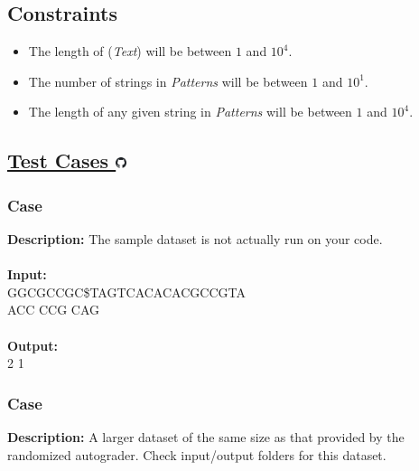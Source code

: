 \documentclass{article}
\renewcommand{\sc}[1]{\text{\scshape #1}}
\newcommand{\code}[1]{{\fontfamily{pcr}\selectfont #1}}
\newcommand{\gitlogo}{\includegraphics[height=12.5]{c0/gitlogo.png}}
\begin{document}
\subsection*{Constraints}
\begin{itemize}
    \item The length of \sc{BWT}(\emph{Text}) will be between $1$ and $10^4$.
    \item The number of strings in \emph{Patterns} will be between $1$ and $10^1$.
    \item The length of any given string in \emph{Patterns} will be between $1$ and $10^4$.
\end{itemize}
\pagebreak

\subsection*{\href{https://github.com/rjeveloff/BA_problemregister/tree/main/test_cases/chapter_9/9M}{Test Cases \gitlogo}}
\subsubsection*{Case }
\hline \vspace{5}
\textbf{Description:} The sample dataset is not actually run on your code.\\ \\
\noindent \textbf{Input:}\\
\code{GGCGCCGC\$TAGTCACACACGCCGTA\\ACC CCG CAG}\\ \\
\noindent \textbf{Output:}\\
\code{1 2 1}

\subsubsection*{Case }
\hline \vspace{5}
\textbf{Description:} A larger dataset of the same size as that provided by the randomized autograder. Check input/output folders for this dataset.\\ \\
\pagebreak
\end{document}
